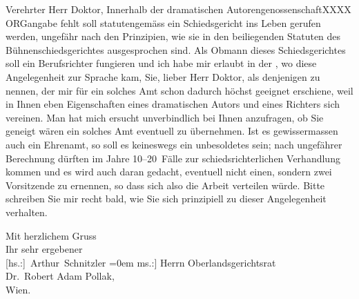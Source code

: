 \pstart{}Verehrter Herr Doktor,\pend\vspace{0.5em}
\pstart
           Innerhalb der dramatischen AutorengenossenschaftXXXX ORGangabe fehlt
               soll  statutengemäss ein Schiedsgericht ins Leben
               gerufen werden, ungefähr nach den Prinzipien, wie sie in den beiliegenden Statuten
               des Bühnenschiedsgerichtes ausgesprochen sind. Als Obmann dieses Schiedsgerichtes
               soll ein Berufsrichter fungieren und ich habe mir erlaubt in der \label{K_L02356-1v}\label{K_L02356-1}, wo diese Angelegenheit zur Sprache kam, Sie, lieber Herr Doktor, als
               denjenigen zu nennen, der mir für ein solches Amt schon dadurch höchst geeignet
               erschiene, weil in Ihnen eben Eigenschaften eines dramatischen Autors und eines
               Richters sich vereinen. Man hat mich ersucht unverbindlich bei Ihnen anzufragen, ob
               Sie geneigt wären ein solches Amt eventuell zu übernehmen. Ist es gewissermassen auch
               ein Ehrenamt, so soll es keineswegs ein unbesoldetes sein; nach ungefährer Berechnung
               dürften im Jahre 10–20 Fälle zur schiedsrichterlichen Verhandlung kommen und es wird
               auch daran gedacht, eventuell nicht einen, sondern zwei Vorsitzende zu ernennen, so
               dass sich also die Arbeit verteilen würde. Bitte schreiben Sie mir recht bald, wie
               Sie sich prinzipiell zu dieser Angelegenheit verhalten.\pend
           
\pstart
           Mit herzlichem Gruss{\\[\baselineskip]}Ihr sehr ergebener{\\[\baselineskip]}\spacefill\mbox{{[}hs.:{]} Arthur Schnitzler}\pend
           \leftskip=0em{}
\pstart
           \noindent{}{[}ms.:{]} Herrn Oberlandsgerichtsrat{\\}Dr. Robert Adam Pollak,{\\}Wien.\pend
           \endnumbering{}  
      